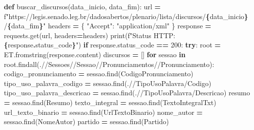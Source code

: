 \documentclass[
]{article}
\newenvironment{Shaded}{\begin{snugshade}}{\end{snugshade}}
\newcommand{\BuiltInTok}[1]{#1}
\newcommand{\ControlFlowTok}[1]{\textcolor[rgb]{0.13,0.29,0.53}{\textbf{#1}}}
\newcommand{\DecValTok}[1]{\textcolor[rgb]{0.00,0.00,0.81}{#1}}
\newcommand{\KeywordTok}[1]{\textcolor[rgb]{0.13,0.29,0.53}{\textbf{#1}}}
\newcommand{\NormalTok}[1]{#1}
\newcommand{\OperatorTok}[1]{\textcolor[rgb]{0.81,0.36,0.00}{\textbf{#1}}}
\newcommand{\SpecialCharTok}[1]{\textcolor[rgb]{0.81,0.36,0.00}{\textbf{#1}}}
\newcommand{\SpecialStringTok}[1]{\textcolor[rgb]{0.31,0.60,0.02}{#1}}
\newcommand{\StringTok}[1]{\textcolor[rgb]{0.31,0.60,0.02}{#1}}
\begin{document}
\begin{Shaded}
\begin{Highlighting}[]
\KeywordTok{def}\NormalTok{ buscar\_discursos(data\_inicio, data\_fim):}
\NormalTok{    url }\OperatorTok{=} \SpecialStringTok{f"https://legis.senado.leg.br/dadosabertos/plenario/lista/discursos/}\SpecialCharTok{\{}\NormalTok{data\_inicio}\SpecialCharTok{\}}\SpecialStringTok{/}\SpecialCharTok{\{}\NormalTok{data\_fim}\SpecialCharTok{\}}\SpecialStringTok{"}
\NormalTok{    headers }\OperatorTok{=}\NormalTok{ \{}
        \StringTok{"Accept"}\NormalTok{: }\StringTok{"application/xml"}
\NormalTok{    \}}
\NormalTok{    response }\OperatorTok{=}\NormalTok{ requests.get(url, headers}\OperatorTok{=}\NormalTok{headers)}
    \BuiltInTok{print}\NormalTok{(}\SpecialStringTok{f"Status HTTP: }\SpecialCharTok{\{}\NormalTok{response}\SpecialCharTok{.}\NormalTok{status\_code}\SpecialCharTok{\}}\SpecialStringTok{"}\NormalTok{)}
    \ControlFlowTok{if}\NormalTok{ response.status\_code }\OperatorTok{==} \DecValTok{200}\NormalTok{:}
        \ControlFlowTok{try}\NormalTok{:}
\NormalTok{            root }\OperatorTok{=}\NormalTok{ ET.fromstring(response.content)}
\NormalTok{            discursos }\OperatorTok{=}\NormalTok{ []}
            \ControlFlowTok{for}\NormalTok{ sessao }\KeywordTok{in}\NormalTok{ root.findall(}\StringTok{\textquotesingle{}.//Sessoes//Sessao//Pronunciamentos//Pronunciamento\textquotesingle{}}\NormalTok{):}
\NormalTok{                codigo\_pronunciamento }\OperatorTok{=}\NormalTok{ sessao.find(}\StringTok{\textquotesingle{}CodigoPronunciamento\textquotesingle{}}\NormalTok{)}
\NormalTok{                tipo\_uso\_palavra\_codigo }\OperatorTok{=}\NormalTok{ sessao.find(}\StringTok{\textquotesingle{}.//TipoUsoPalavra/Codigo\textquotesingle{}}\NormalTok{)}
\NormalTok{                tipo\_uso\_palavra\_descricao }\OperatorTok{=}\NormalTok{ sessao.find(}\StringTok{\textquotesingle{}.//TipoUsoPalavra/Descricao\textquotesingle{}}\NormalTok{)}
\NormalTok{                resumo }\OperatorTok{=}\NormalTok{ sessao.find(}\StringTok{\textquotesingle{}Resumo\textquotesingle{}}\NormalTok{)}
\NormalTok{                texto\_integral }\OperatorTok{=}\NormalTok{ sessao.find(}\StringTok{\textquotesingle{}TextoIntegralTxt\textquotesingle{}}\NormalTok{)}
\NormalTok{                url\_texto\_binario }\OperatorTok{=}\NormalTok{ sessao.find(}\StringTok{\textquotesingle{}UrlTextoBinario\textquotesingle{}}\NormalTok{)}
\NormalTok{                nome\_autor }\OperatorTok{=}\NormalTok{ sessao.find(}\StringTok{\textquotesingle{}NomeAutor\textquotesingle{}}\NormalTok{)}
\NormalTok{                partido }\OperatorTok{=}\NormalTok{ sessao.find(}\StringTok{\textquotesingle{}Partido\textquotesingle{}}\NormalTok{)}


\end{Highlighting}
\end{Shaded}
\end{document}
